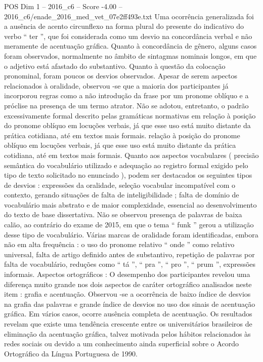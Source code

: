 \begin{textsample}{POS Dim 1 – 2016\_c6 – Score -4.00 – 2016\_c6/enade\_2016\_med\_vet\_07e2ff493e.txt}
Uma ocorrência generalizada foi a ausência de acento circunflexo na forma plural do presente do indicativo do verbo “ ter ”, que foi considerada como um desvio na concordância verbal e não meramente de acentuação gráfica.
Quanto à concordância de gênero, alguns casos foram observados, normalmente no âmbito de sintagmas nominais longos, em que o adjetivo está afastado do substantivo.
Quanto à questão da colocação pronominal, foram poucos os desvios observados.
Apesar de serem aspectos relacionados à oralidade, observou -se que a maioria dos participantes já incorporou regras como a não introdução da frase por um pronome oblíquo e a próclise na presença de um termo atrator.
Não se adotou, entretanto, o padrão excessivamente formal descrito pelas gramáticas normativas em relação à posição do pronome oblíquo em locuções verbais, já que esse uso está muito distante da prática cotidiana, até em textos mais formais. relação à posição do pronome oblíquo em locuções verbais, já que esse uso está muito distante da prática cotidiana, até em textos mais formais.
Quanto aos aspectos vocabulares ( precisão semântica do vocabulário utilizado e adequação ao registro formal exigido pelo tipo de texto solicitado no enunciado ), podem ser destacados os seguintes tipos de desvios : expressões da oralidade, seleção vocabular incompatível com o contexto, gerando situações de falta de inteligibilidade ; falta de domínio de vocabulário mais abstrato e de maior complexidade, essencial ao desenvolvimento do texto de base dissertativa.
Não se observou presença de palavras de baixa calão, ao contrário do exame de 2015, em que o tema “ funk ” gerou a utilização desse tipo de vocabulário.
Várias marcas de oralidade foram identificadas, embora não em alta frequência : o uso do pronome relativo “ onde ” como relativo universal, falta de artigo definido antes de substantivo, repetição de palavras por falta de vocabulário, reduções como “ tá ”, “ pra ”, “ pro ”, “ prum ”, expressões informais.
Aspectos ortográficos : O desempenho dos participantes revelou uma diferença muito grande nos dois aspectos de caráter ortográfico analisados neste item : grafia e acentuação.
Observou -se a ocorrência de baixo índice de desvios na grafia das palavras e grande índice de desvios no uso dos sinais de acentuação gráfica.
Em vários casos, ocorre ausência completa de acentuação.
Os resultados revelam que existe uma tendência crescente entre os universitários brasileiros de eliminação da acentuação gráfica, talvez motivada pelos hábitos relacionados às redes sociais ou devido a um conhecimento ainda superficial sobre o Acordo Ortográfico da Língua Portuguesa de 1990.

\end{textsample}
